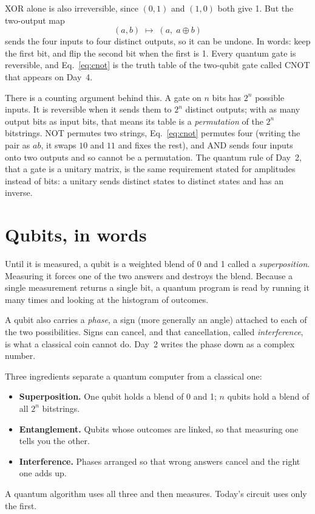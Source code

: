 \documentclass[11pt]{article}
\begin{document}
XOR alone is also irreversible, since $(0,1)$ and $(1,0)$ both give 1. But the two-output map
\begin{equation}
(a, b) \;\longmapsto\; (a,\; a \oplus b)
\label{eq:cnot}
\end{equation}
sends the four inputs to four distinct outputs, so it can be undone. In words: keep the first bit, and flip the second bit when the first is 1. Every quantum gate is reversible, and Eq.~\eqref{eq:cnot} is the truth table of the two-qubit gate called CNOT that appears on Day~4.

There is a counting argument behind this. A gate on $n$ bits has $2^n$ possible inputs. It is reversible when it sends them to $2^n$ distinct outputs; with as many output bits as input bits, that means its table is a \emph{permutation} of the $2^n$ bitstrings. NOT permutes two strings, Eq.~\eqref{eq:cnot} permutes four (writing the pair as $ab$, it swaps $10$ and $11$ and fixes the rest), and AND sends four inputs onto two outputs and so cannot be a permutation. The quantum rule of Day~2, that a gate is a unitary matrix, is the same requirement stated for amplitudes instead of bits: a unitary sends distinct states to distinct states and has an inverse.

\section{Qubits, in words}

Until it is measured, a qubit is a weighted blend of 0 and 1 called a \emph{superposition}. Measuring it forces one of the two answers and destroys the blend. Because a single measurement returns a single bit, a quantum program is read by running it many times and looking at the histogram of outcomes.

A qubit also carries a \emph{phase}, a sign (more generally an angle) attached to each of the two possibilities. Signs can cancel, and that cancellation, called \emph{interference}, is what a classical coin cannot do. Day~2 writes the phase down as a complex number.

Three ingredients separate a quantum computer from a classical one:
\begin{itemize}
\item \textbf{Superposition.} One qubit holds a blend of 0 and 1; $n$ qubits hold a blend of all $2^n$ bitstrings.
\item \textbf{Entanglement.} Qubits whose outcomes are linked, so that measuring one tells you the other.
\item \textbf{Interference.} Phases arranged so that wrong answers cancel and the right one adds up.
\end{itemize}
A quantum algorithm uses all three and then measures. Today's circuit uses only the first.
\end{document}
